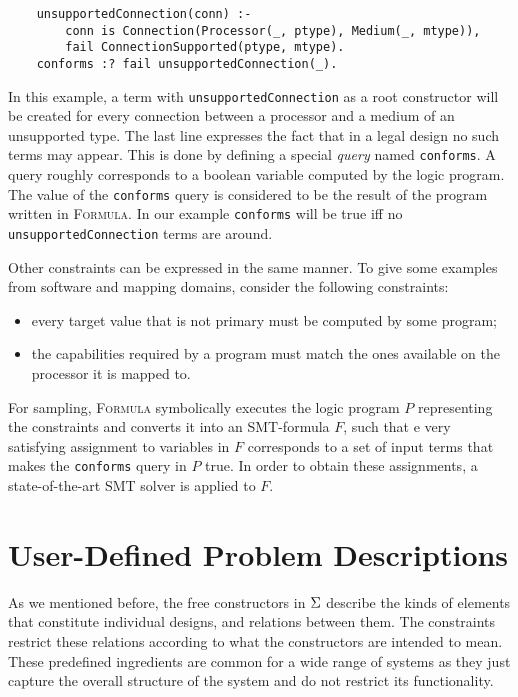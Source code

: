 \documentclass[conference]{IEEEtran}
\newcommand{\FORMULA}{\textsc{Formula}}
\begin{document}
{\scriptsize\begin{verbatim}
    unsupportedConnection(conn) :- 
        conn is Connection(Processor(_, ptype), Medium(_, mtype)), 
        fail ConnectionSupported(ptype, mtype).
    conforms :? fail unsupportedConnection(_).
\end{verbatim}}

In this example, a term with \texttt{unsupportedConnection} as a root constructor will be created for every connection between a processor and a medium of an unsupported type. The last line expresses the fact that in a legal design no such terms may appear. This is done by defining a special \emph{query} named \texttt{conforms}. A query roughly corresponds to a boolean variable computed by the logic program. The value of the \texttt{conforms} query is considered to be the result of the program written in \FORMULA{}. In our example \texttt{conforms} will be true iff no  \texttt{unsupportedConnection} terms are around.

Other constraints can be expressed in the same manner. To give some examples from software and mapping domains, consider the following constraints:
\begin{itemize}
  \item every target value that is not primary must be computed by some program;
  \item the capabilities required by a program must match the ones available on the processor it is mapped to.
\end{itemize}

For sampling, \FORMULA{} symbolically executes the logic program $P$ representing the constraints and converts it into an SMT-formula $F$, such that e
very satisfying assignment to variables in $F$ corresponds to a set of input terms that makes the \texttt{conforms} query in $P$ true. In order to obtain these assignments, a state-of-the-art SMT solver is applied to $F$.

\section{User-Defined Problem Descriptions}

As we mentioned before, the free constructors in $\Sigma$ describe the kinds of elements that constitute individual designs, and relations between them. The constraints restrict these relations according to what the constructors are intended to mean. These predefined ingredients are common for a wide range of systems as they just capture the overall structure of the system and do not restrict its functionality. 
\end{document}
